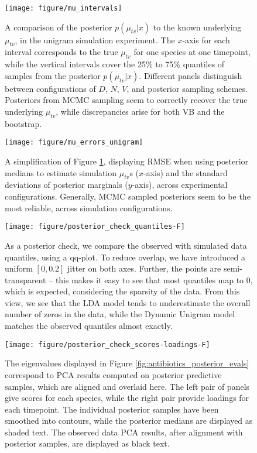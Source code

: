 \documentclass{article}
\begin{document}
\begin{figure}[ht]
  \centering
  \texttt{[image: figure/mu\_intervals]}
  \caption{
    A comparison of the posterior $p\left(\mu_{tv} \vert x\right)$ to the known
    underlying $\mu_{tv}$, in the unigram simulation experiment. The $x$-axis
    for each interval corresponds to the true $\mu_{tv}$ for one species at one
    timepoint, while the vertical intervals cover the 25\% to 75\% quantiles of
    samples from the posterior $p\left(\mu_{tv} \vert x\right)$. Different
    panels distinguish between configurations of $D$, $N$, $V$, and posterior
    sampling schemes. Posteriors from MCMC sampling seem to correctly recover
    the true underlying $\mu_{tv}$, while discrepancies arise for both VB and
    the bootstrap.
    \label{fig:mu_intervals} }
\end{figure}

\begin{figure}[ht]
  \centering
  \texttt{[image: figure/mu\_errors\_unigram]}
  \caption{A simplification of Figure \ref{fig:mu_intervals}, displaying RMSE when
    using posterior medians to estimate simulation $\mu_{tv}$s ($x$-axis) and
    the standard deviations of posterior marginals ($y$-axis), across
    experimental configurations. Generally, MCMC sampled posteriors seem to be
    the most reliable, across simulation configurations.
    \label{fig:mu_errors_unigram}
  }
\end{figure}

\begin{figure}[!p]
  \centering
  \texttt{[image: figure/posterior\_check\_quantiles-F]}
  \caption{As a posterior check, we compare the observed with simulated
    data quantiles, using a qq-plot. To reduce overlap, we have introduced a
    uniform $\left[0, 0.2\right]$ jitter on both axes. Further, the points are
    semi-transparent -- this makes it easy to see that most quantiles map to 0,
    which is expected, considering the sparsity of the data. From this view, we
    see that the LDA model tends to underestimate the overall number of zeros in
    the data, while the Dynamic Unigram model matches the observed quantiles
    almost exactly. \label{fig:antibiotics_posterior_quantiles} }
\end{figure}

\begin{figure}[!p]
  \centering
  \texttt{[image: figure/posterior\_check\_scores-loadings-F]}
  \caption{The eigenvalues displayed in Figure
    \ref{fig:antibiotics_posterior_evals} correspond to PCA results computed on
    posterior predictive samples, which are aligned and overlaid here. The left
    pair of panels give scores for each species, while the right pair provide
    loadings for each timepoint. The individual posterior samples have been
    smoothed into contours, while the posterior medians are displayed as shaded
    text. The observed data PCA results, after alignment with posterior samples,
    are displayed as black text. \label{fig:antibiotics_posterior_pca} }
\end{figure}
\end{document}
